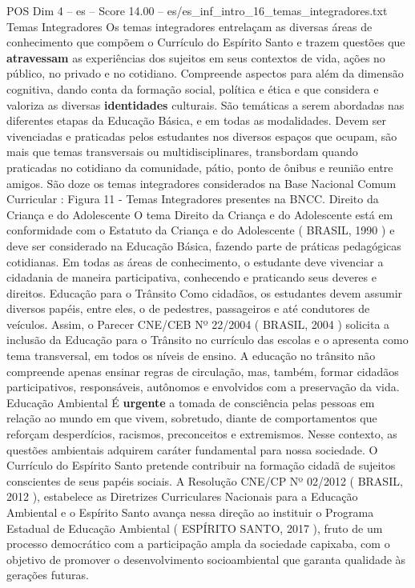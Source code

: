 \begin{textsample}{POS Dim 4 – es – Score 14.00 – es/es\_inf\_intro\_16\_temas\_integradores.txt}  \label{ex:f4_pos_075}
Temas Integradores Os temas integradores entrelaçam as diversas áreas de conhecimento que compõem o Currículo do Espírito Santo e trazem questões que \textbf{atravessam} as experiências dos sujeitos em seus contextos de vida, ações no público, no privado e no cotidiano.
Compreende aspectos para além da dimensão cognitiva, dando conta da formação social, política e ética e que considera e valoriza as diversas \textbf{identidades} culturais.
São temáticas a serem abordadas nas diferentes etapas da Educação Básica, e em todas as modalidades.
Devem ser vivenciadas e praticadas pelos estudantes nos diversos espaços que ocupam, são mais que temas transversais ou multidisciplinares, transbordam quando praticadas no cotidiano da comunidade, pátio, ponto de ônibus e reunião entre amigos.
São doze os temas integradores considerados na Base Nacional Comum Curricular : Figura 11 - Temas Integradores presentes na BNCC.
Direito da Criança e do Adolescente O tema Direito da Criança e do Adolescente está em conformidade com o Estatuto da Criança e do Adolescente ( BRASIL, 1990 ) e deve ser considerado na Educação Básica, fazendo parte de práticas pedagógicas cotidianas.
Em todas as áreas de conhecimento, o estudante deve vivenciar a cidadania de maneira participativa, conhecendo e praticando seus deveres e direitos.
Educação para o Trânsito Como cidadãos, os estudantes devem assumir diversos papéis, entre eles, o de pedestres, passageiros e até condutores de veículos.
Assim, o Parecer CNE/CEB Nº 22/2004 ( BRASIL, 2004 ) solicita a inclusão da Educação para o Trânsito no currículo das escolas e o apresenta como tema transversal, em todos os níveis de ensino.
A educação no trânsito não compreende apenas ensinar regras de circulação, mas, também, formar cidadãos participativos, responsáveis, autônomos e envolvidos com a preservação da vida.
Educação Ambiental É \textbf{urgente} a tomada de consciência pelas pessoas em relação ao mundo em que vivem, sobretudo, diante de comportamentos que reforçam desperdícios, racismos, preconceitos e extremismos.
Nesse contexto, as questões ambientais adquirem caráter fundamental para nossa sociedade.
O Currículo do Espírito Santo pretende contribuir na formação cidadã de sujeitos conscientes de seus papéis sociais.
A Resolução CNE/CP Nº 02/2012 ( BRASIL, 2012 ), estabelece as Diretrizes Curriculares Nacionais para a Educação Ambiental e o Espírito Santo avança nessa direção ao instituir o Programa Estadual de Educação Ambiental ( ESPÍRITO SANTO, 2017 ), fruto de um processo democrático com a participação ampla da sociedade capixaba, com o objetivo de promover o desenvolvimento socioambiental que garanta qualidade às gerações futuras.

\end{textsample}
